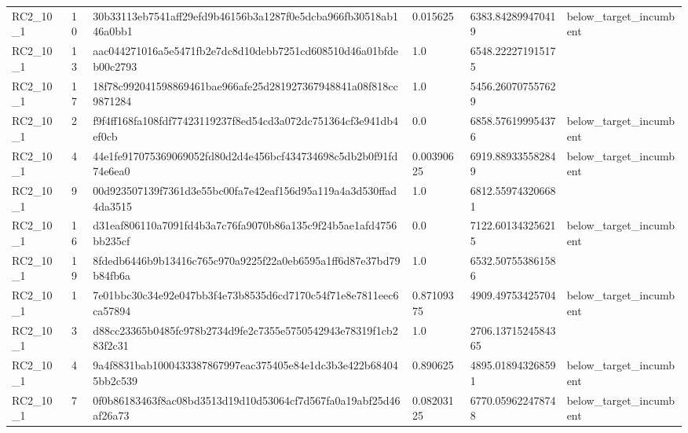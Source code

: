 \begin{tabular}{llllll}
 RC2\_10\_1 & 10 & 30b33113eb7541aff29efd9b46156b3a1287f0e5dcba966fb30518ab146a0bb1 & 0.015625 & 6383.842899470419 & below\_target\_incumbent \\
 RC2\_10\_1 & 13 & aac044271016a5e5471fb2e7dc8d10debb7251cd608510d46a01bfdeb00c2793 & 1.0 & 6548.222271915175 &  \\
 RC2\_10\_1 & 17 & 18f78c992041598869461bae966afe25d281927367948841a08f818cc9871284 & 1.0 & 5456.260707557629 &  \\
 RC2\_10\_1 & 2 & f9f4ff168fa108fdf77423119237f8ed54cd3a072dc751364cf3e941db4ef0cb & 0.0 & 6858.576199954376 & below\_target\_incumbent \\
 RC2\_10\_1 & 4 & 44e1fe917075369069052fd80d2d4e456bcf434734698c5db2b0f91fd74e6ea0 & 0.00390625 & 6919.889335582849 & below\_target\_incumbent \\
 RC2\_10\_1 & 9 & 00d923507139f7361d3e55bc00fa7e42eaf156d95a119a4a3d530ffad4da3515 & 1.0 & 6812.559743206681 &  \\
 RC2\_10\_1 & 16 & d31eaf806110a7091fd4b3a7c76fa9070b86a135c9f24b5ae1afd4756bb235cf & 0.0 & 7122.601343256215 & below\_target\_incumbent \\
 RC2\_10\_1 & 19 & 8fdedb6446b9b13416c765c970a9225f22a0eb6595a1ff6d87e37bd79b84fb6a & 1.0 & 6532.507553861586 &  \\
 RC2\_10\_1 & 1 & 7e01bbc30c34e92e047bb3f4e73b8535d6cd7170c54f71e8e7811eec6ca57894 & 0.87109375 & 4909.49753425704 & below\_target\_incumbent \\
 RC2\_10\_1 & 3 & d88cc23365b0485fc978b2734d9fe2c7355e5750542943e78319f1cb283f2c31 & 1.0 & 2706.1371524584365 &  \\
 RC2\_10\_1 & 4 & 9a4f8831bab1000433387867997eac375405e84e1dc3b3e422b684045bb2c539 & 0.890625 & 4895.018943268591 & below\_target\_incumbent \\
 RC2\_10\_1 & 7 & 0f0b86183463f8ac08bd3513d19d10d53064cf7d567fa0a19abf25d46af26a73 & 0.08203125 & 6770.059622478748 & below\_target\_incumbent \\
 \hline
\end{tabular}
